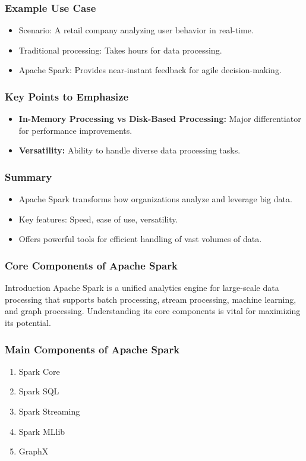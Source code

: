 \documentclass[aspectratio=169]{beamer}
\begin{document}
\begin{frame}[fragile]
    \frametitle{Example Use Case}
    \begin{itemize}
        \item Scenario: A retail company analyzing user behavior in real-time.
        \item Traditional processing: Takes hours for data processing.
        \item Apache Spark: Provides near-instant feedback for agile decision-making.
    \end{itemize}
\end{frame}

\begin{frame}[fragile]
    \frametitle{Key Points to Emphasize}
    \begin{itemize}
        \item \textbf{In-Memory Processing vs Disk-Based Processing:} Major differentiator for performance improvements.
        \item \textbf{Versatility:} Ability to handle diverse data processing tasks.
    \end{itemize}
\end{frame}

\begin{frame}[fragile]
    \frametitle{Summary}
    \begin{itemize}
        \item Apache Spark transforms how organizations analyze and leverage big data.
        \item Key features: Speed, ease of use, versatility.
        \item Offers powerful tools for efficient handling of vast volumes of data.
    \end{itemize}
\end{frame}

\begin{frame}
    \frametitle{Core Components of Apache Spark}
    \begin{block}{Introduction}
        Apache Spark is a unified analytics engine for large-scale data processing that supports batch processing, stream processing, machine learning, and graph processing. Understanding its core components is vital for maximizing its potential.
    \end{block}
\end{frame}

\begin{frame}
    \frametitle{Main Components of Apache Spark}
    \begin{enumerate}
        \item Spark Core
        \item Spark SQL
        \item Spark Streaming
        \item Spark MLlib
        \item GraphX
    \end{enumerate}
\end{frame}
\end{document}
